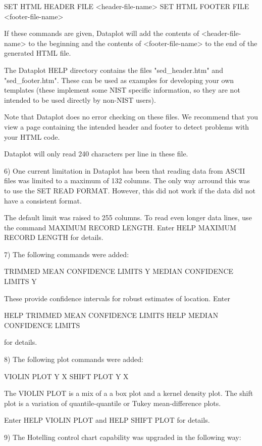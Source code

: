 {       SET HTML HEADER FILE <header-file-name>
       SET HTML FOOTER FILE <footer-file-name>

    If these commands are given, Dataplot will add the contents of
    <header-file-name> to the beginning and the contents of
    <footer-file-name> to the end of the generated HTML file.

    The Dataplot HELP directory contains the files
    "sed_header.htm" and "sed_footer.htm".  These can be used as
    examples for developing your own templates (these implement
    some NIST specific information, so they are not intended to be
    used directly by non-NIST users).

    Note that Dataplot does no error checking on these files.  We
    recommend that you view a page containing the intended header
    and footer to detect problems with your HTML code.

    Dataplot will only read 240 characters per line in these file.

 6) One current limitation in Dataplot has been that reading data
    from ASCII files was limited to a maximum of 132 columns.  The
    only way arround this was to use the SET READ FORMAT.  However,
    this did not work if the data did not have a consistent format.

    The default limit was raised to 255 columns.  To read even
    longer data lines, use the command MAXIMUM RECORD LENGTH.
    Enter HELP MAXIMUM RECORD LENGTH for details.

 7) The following commands were added:

       TRIMMED MEAN CONFIDENCE LIMITS Y
       MEDIAN CONFIDENCE LIMITS Y

    These provide confidence intervals for robust estimates of
    location.  Enter

       HELP TRIMMED MEAN CONFIDENCE LIMITS
       HELP MEDIAN CONFIDENCE LIMITS

    for details.

 8) The following plot commands were added:

       VIOLIN PLOT Y X
       SHIFT PLOT Y X

    The VIOLIN PLOT is a mix of a a box plot and a kernel density
    plot.  The shift plot is a variation of quantile-quantile or
    Tukey mean-difference plots.

    Enter HELP VIOLIN PLOT and HELP SHIFT PLOT for details.

 9) The Hotelling control chart capability was upgraded in the following
    way:

}
